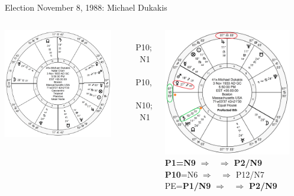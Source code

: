 \begin{frame}[t]{Election November 8, 1988: Michael Dukakis}
\small
\begin{columns}[T, onlytextwidth]
\vspace{-1em}
{\includegraphics[width=0.9\textwidth]{charts/Dukakis.png}}
\fontsize{8pt}{9pt}\selectfont

\Saturn\, \Trine\, P10; \Trine\, N1 \\
\Venus\, \Sextile\, P10, \Sextile\, N10; \Opposition\, N1

\vspace{-1em}
{\includegraphics[width=0.9\textwidth]{charts/Dukakis-Prof-8th.png}}
\fontsize{8pt}{9pt}\selectfont
\textbf{\dgreen P1=N9}
	$\Rightarrow$ \Saturn\, $\Rightarrow$ \textbf{\dgreen P2/N9}\\
\textbf{\red P10}=N6
	$\Rightarrow$ \Venus\, $\Rightarrow$ P12/N7\\
PE=\textbf{\dgreen P1/N9}
	 $\Rightarrow$ \Saturn\, $\Rightarrow$ \textbf{\dgreen P2/N9}


\end{columns}
\end{frame}
